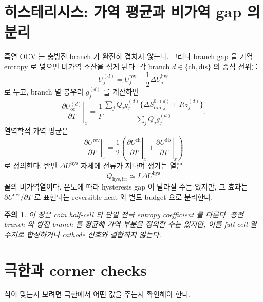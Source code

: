 \documentclass[11pt,a4paper]{article}
\newtheorem*{warnbox}{주의}
\newcommand{\rxn}{\mathrm{rxn}}
\newcommand{\rev}{\mathrm{rev}}
\newcommand{\irr}{\mathrm{irr}}
\newcommand{\oc}{\mathrm{oc}}
\newcommand{\hys}{\mathrm{hys}}
\newcommand{\ch}{\mathrm{ch}}
\newcommand{\dis}{\mathrm{dis}}
\begin{document}
\section{히스테리시스: 가역 평균과 비가역 gap 의 분리}
\label{sec:hysteresis}
흑연 OCV 는 충방전 branch 가 완전히 겹치지 않는다. 그러나 branch gap 을 가역 entropy 로 넣으면
비가역 소산을 섞게 된다. 각 branch $d\in\{\ch,\dis\}$ 의 중심 전위를
\begin{equation}
U_j^{(d)}=U_j^{\rev}\pm\frac{1}{2}\Delta U_j^{\hys}
\label{eq:hys_center}
\end{equation}
로 두고, branch 별 봉우리 $g_j^{(d)}$ 를 계산하면
\begin{equation}
\left.\frac{\partial U_\oc^{(d)}}{\partial T}\right|_x
=\frac{1}{F}
\frac{\sum_j Q_jg_j^{(d)}\{\Delta S_{\rxn,j}^{0,(d)}+Rz_j^{(d)}\}}
     {\sum_j Q_jg_j^{(d)}}.
\label{eq:hys_branch}
\end{equation}
열역학적 가역 평균은
\begin{equation}
\left.\frac{\partial U^{\rev}}{\partial T}\right|_x
=\frac{1}{2}\left(
\left.\frac{\partial U^{\ch}}{\partial T}\right|_x+
\left.\frac{\partial U^{\dis}}{\partial T}\right|_x
\right)
\label{eq:hys_average}
\end{equation}
로 정의한다. 반면 $\Delta U^\hys$ 자체에 전류가 지나며 생기는 열은
\begin{equation}
\dot Q_{\hys,\irr}\simeq I\,\Delta U^\hys
\label{eq:hys_heat}
\end{equation}
꼴의 비가역열이다. 온도에 따라 hysteresis gap 이 달라질 수는 있지만, 그 효과는
$\partial U^\rev/\partial T$ 로 표현되는 reversible heat 와 별도 budget 으로 분리한다.

\begin{warnbox}
이 장은 coin half-cell 의 단일 전극 entropy coefficient 를 다룬다. 충전 branch 와 방전 branch 를 평균해
가역 부분을 정의할 수는 있지만, 이를 full-cell 열수지로 합성하거나 cathode 신호와 결합하지 않는다.
\end{warnbox}

\section{극한과 corner checks}
\label{sec:limits}
식이 맞는지 보려면 극한에서 어떤 값을 주는지 확인해야 한다.
\end{document}
